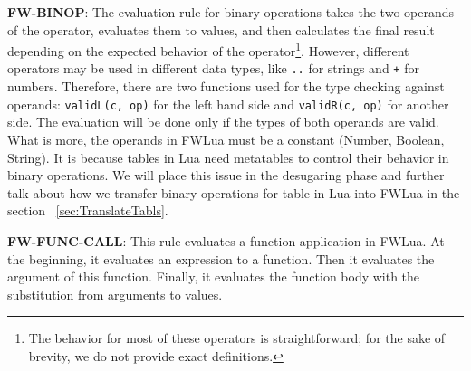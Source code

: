 {\bf FW-BINOP}: The evaluation rule for binary operations takes the two operands of the operator, evaluates them to values, and then calculates the final result depending on the expected behavior of the operator\footnote{
  The behavior for most of these operators is straightforward;
  for the sake of brevity, we do not provide exact definitions.
}.
However, different operators may be used in different data types, like {\tt ..} for strings and {\tt +} for numbers. Therefore, there are two functions used for the type checking against operands: {\tt validL(c, op)} for the left hand side and {\tt validR(c, op)} for another side. The evaluation will be done only if the types of both operands are valid.
What is more, the operands in FWLua must be a constant (Number, Boolean, String). It is because tables in Lua need metatables to control their behavior in binary operations. We will place this issue in the desugaring phase and further talk about how we transfer binary operations for table in Lua into FWLua in the section ~\ref{sec:TranslateTabls}.

{\bf FW-FUNC-CALL}: This rule evaluates a function application in FWLua. At the beginning, it evaluates an expression to a function. Then it evaluates the argument of this function.  Finally, it evaluates the function body with the substitution from arguments to values. 


